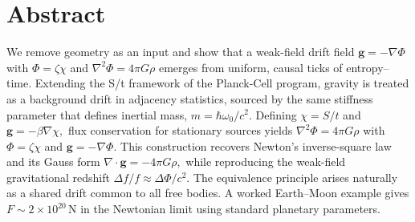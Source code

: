 \section*{Abstract}

We remove geometry as an input and show that a weak-field drift field
\(
  \mathbf{g} = -\nabla\Phi
\)
with
\(
  \Phi = \zeta\chi
\)
and
\(
  \nabla^{2}\Phi = 4\pi G\rho
\)
emerges from uniform, causal ticks of entropy--time.
Extending the S/t framework of the Planck-Cell program, gravity is treated
as a background drift in adjacency statistics, sourced by the same stiffness
parameter that defines inertial mass,
\(
  m = \hbar\omega_{0}/c^{2}.
\)
Defining
\(
  \chi = S/t
\)
and
\(
  \mathbf{g} = -\beta\nabla\chi,
\)
flux conservation for stationary sources yields
\(
  \nabla^{2}\Phi = 4\pi G\rho
\)
with
\(
  \Phi = \zeta\chi
\)
and
\(
  \mathbf{g} = -\nabla\Phi.
\)
This construction recovers Newton’s inverse-square law and its Gauss form
\(
  \nabla\!\cdot\!\mathbf{g} = -4\pi G\rho,
\)
while reproducing the weak-field gravitational redshift
\(
  \Delta f / f \approx \Delta\Phi / c^{2}.
\)
The equivalence principle arises naturally as a shared drift common to all
free bodies.
A worked Earth--Moon example gives
\(
  F \sim 2\times10^{20}\,\mathrm{N}
\)
in the Newtonian limit using standard planetary parameters.
